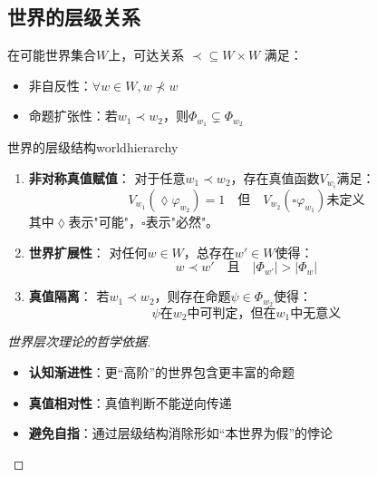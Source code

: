 \documentclass[lang=cn,newtx,10pt,scheme=chinese]{elegantbook}
\begin{document}
\subsection{世界的层级关系}

\begin{definition}[可达关系]
    在可能世界集合$W$上，可达关系 $\prec \subseteq W \times W$ 满足：
    \begin{itemize}
        \item 非自反性：$\forall w \in W, w \nprec w$
        \item 命题扩张性：若$w_1 \prec w_2$，则$\varPhi_{w_1} \subsetneq \varPhi_{w_2}$
    \end{itemize}
\end{definition}

\begin{theorem}{世界的层级结构}{worldhierarchy}
    \begin{enumerate}
        \item \textbf{非对称真值赋值}：
              对于任意$w_1 \prec w_2$，存在真值函数$V_{w_i}$满足：
              \[
                  V_{w_1}(\lozenge \varphi_{w_2}) = 1 \quad \text{但} \quad V_{w_2}(\square \varphi_{w_1}) \text{未定义}
              \]
              其中$\lozenge$表示"可能"，$\square$表示"必然"。

        \item \textbf{世界扩展性}：
              对任何$w \in W$，总存在$w' \in W$使得：
              \[
                  w \prec w' \quad \text{且} \quad |\varPhi_{w'}| > |\varPhi_w|
              \]

        \item \textbf{真值隔离}：
              若$w_1 \prec w_2$，则存在命题$\psi \in \varPhi_{w_2}$使得：
              \[
                  \psi \text{在} w_2 \text{中可判定，但在} w_1 \text{中无意义}
              \]
    \end{enumerate}
\end{theorem}

\begin{proof}[世界层次理论的哲学依据]
    \begin{itemize}
        \item \textbf{认知渐进性}：更“高阶”的世界包含更丰富的命题
        \item \textbf{真值相对性}：真值判断不能逆向传递
        \item \textbf{避免自指}：通过层级结构消除形如“本世界为假”的悖论
    \end{itemize}
\end{proof}
\end{document}
